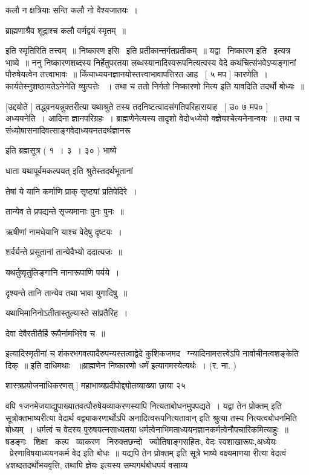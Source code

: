 \documentclass[11pt, openany]{book}
\begin{document}
 कलौ न क्षत्रियाः सन्ति कलौ नो वैश्यजातयः~। 

 ब्राह्मणाश्रैव शूद्राश्च कलौ वर्णद्वयं स्मृतम्~॥ 

 इति स्मृतिरिति तत्त्वम्~॥ निष्कारण इसि \textendash\ इति प्रतीकान्तर्गतप्रतीकम्~॥
यद्वा \textendash\ {\qt निष्कारण इति} \textendash\ इत्यत्र भाष्ये~॥ ननु निष्कारणशब्दस्य
निर्हेतुपरतया लब्धस्यानादिस्वरूपनित्यत्वस्य वेदे कथंचित्संभवेऽप्यङ्गानां
पौरुषेयत्वेन तत्त्वाभावः~॥ किंचाध्ययनज्ञानयोस्तत्त्वाभावापत्तिरत
आह \textendash\ [ ५ मप ] कारणेति~। कार्यतेस्नुशष्ठायतेऽनेनेति व्युत्पत्तेः
~। तथा च ततो निर्गतो निष्कारणो नित्य इति यावदिति तदर्थो बोध्यः~॥ 

 [उद्दयोते ] तद्ध्वनयन्नुक्तरीत्या यथाश्रुते तस्य
तदनिष्टत्वादसंगतिपरिहारायाह \textendash\ [ उ० ७ मप० ] अध्ययनेति~। आदिना
ज्ञानपरिग्रहः~। ब्राह्मणेनेत्यस्य तादृशो वेदो५ध्येयो
क्ज्ञेयश्चेत्यनेनान्वयः~॥ तथा च
संध्योषासनादिवत्साङ्गवेदाध्ययनतदर्थज्ञानरू \textendash\ 



इति ब्रह्मसूत्र ( १~। ३~। ३० ) भाष्ये \textendash\ 

धाता {\qt यथापूर्वमकल्पयत्} इति श्रुतेस्तदर्थभूतानां 

तेषां ये यानि कर्माणि प्राक् सृष्ट्यां प्रतिपेदिरे~। 

तान्येव ते प्रपद्यन्ते सृज्यमानाः पुनः पुनः~॥ 

ऋषीणां नामधेयानि याश्च वेदेषु दृष्टयः~। 

शर्वर्यन्ते प्रसूतानां तान्येवैभ्यो ददात्यजः~॥ 

यथर्तुष्वृतुलिङ्गानि नानारूपाणि पर्यये~। 

दृश्यन्ते तानि तान्येव तथा भावा युगादिषु~॥ 

यथाभिमानिनोऽतीतास्तुल्यास्ते सांप्रतैरिह~। 

देवा देवैरतीतैर्हि रूपैर्नामभिरेव च~॥ 

इत्यादिस्मृतीनां च शंकरभगवत्पादैरुपन्यस्तत्वाद्वेदे कुशिकजमद \textendash\ 
ग्न्यादिनामसत्त्वेऽपि नार्वाचीनत्वशङ्केति दिक्~॥ इति दाधिमथाः
~॥ब्राह्मणेन निष्कारणो धर्मं इत्यागमस्येत्यर्थः~। (र. ना. ) 

शास्त्रप्रयोजनाधिकरणस् ] महाभाष्यप्रदीपोद्द्योतव्याख्या छाया २५



वपि १जनमेजयाद्युपाख्यातवत्पौरुषेयव्याकरणस्यापि नित्यताबोधनमुपपद्यते~। 
यद्वा {\qt तेन प्रोक्तम्} इति सूत्रोक्तभाष्यरीत्या वेदार्थ
वद्व्याकरणार्थोऽपि {\qt अनादित्वरूपनित्यतावान्} इति श्रुत्या तस्य
नित्यत्वबोधनमिति बोध्यम्~। धर्मत्वं च वेदस्य पुरुषयत्नसाध्यतया
धर्मत्वेनाभिमताध्ययनज्ञानकर्मत्वेनौपचारिकमित्याहुः~॥ षडङ्गः \textendash\ 
शिक्षा \textendash\ कल्प \textendash\ व्याकरण \textendash\ निरुक्तछन्दो \textendash\ ज्योतिषाङ्गसहितः, वेदः
स्वशाखारूपः,अध्येयः \textendash\ प्रेरणाविषयाध्ययनकर्म वेद इति बोधः~॥ यद्यपि
{\qt तेन प्रोक्तम्} इति सूत्रे भाष्ये वक्ष्यमाणया रीत्या वेदत्वं
४शब्दतदर्थोभयवृत्ति, तथापि {\qt ज्ञेयः इत्यस्य} सम्यगर्थबोधपर्य वसाय्य
\end{document}
